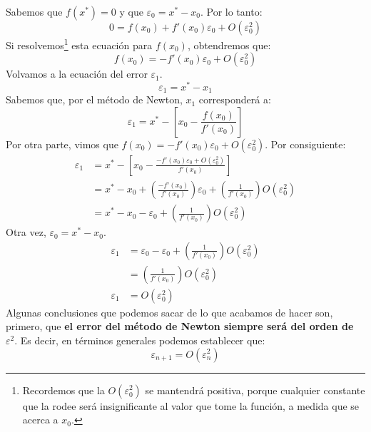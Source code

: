 \documentclass[12pt]{article}
\begin{document}
Sabemos que $f(x^{*}) = 0$ y que $\varepsilon_{0} = x^{*} - x_{0}$. Por lo tanto:
\[
	0 = f(x_{0}) + f'(x_{0})\varepsilon_{0} + O(\varepsilon_{0}^{2})
\]
Si resolvemos\footnote{Recordemos que la $O(\varepsilon_{0}^{2})$ se mantendrá positiva, porque cualquier constante que la rodee será insignificante al valor que tome la función, a medida que se acerca a $x_{0}$.} esta ecuación para $f(x_{0})$, obtendremos que:
\[
 f(x_{0}) = - f'(x_{0})\varepsilon_{0} + O(\varepsilon_{0}^{2})
\]
Volvamos a la ecuación del error $\varepsilon_{1}$.
\[\varepsilon_{1} = x^{*} - x_{1}\]
Sabemos que, por el método de Newton, $x_{1}$ corresponderá a:
\[
\varepsilon_{1} = x^{*}
                  - \left[x_{0} - \frac{f(x_{0})}{f'(x_{0})}\right]
\]
Por otra parte, vimos que $f(x_{0}) = - f'(x_{0})\varepsilon_{0} + O(\varepsilon_{0}^{2})$. Por consiguiente:
\begin{align*}
\varepsilon_{1} &= x^{*}
                  - \left[
                      x_{0} -
                      \frac{- f'(x_{0})\varepsilon_{0} +
                            O(\varepsilon_{0}^{2})}{f'(x_{0})}
                     \right] \\
                &= x^{*} - x_{0}
                   + \left(
					 	\frac{- f'(x_{0})}{f'(x_{0})}
                     \right)
                       \varepsilon_{0}
                   + \left(
                        \frac{1}{f'(x_{0})}
                     \right)
                       O(\varepsilon_{0}^{2}) \\
                &= x^{*} - x_{0} - \varepsilon_{0}
                   + \left(\frac{1}{f'(x_{0})}\right)
                     O(\varepsilon_{0}^{2})
\end{align*}
Otra vez, $\varepsilon_{0} = x^{*} - x_{0}$.
\begin{align*}
\varepsilon_{1} &= \varepsilon_{0} - \varepsilon_{0}
                   + \left(\frac{1}{f'(x_{0})}\right)
                     O(\varepsilon_{0}^{2}) \\
                &= \left(\frac{1}{f'(x_{0})}\right)
                     O(\varepsilon_{0}^{2}) \\
\varepsilon_{1} &= O(\varepsilon_{0}^{2})
\end{align*}
Algunas conclusiones que podemos sacar de lo que acabamos de hacer son, primero, que \textbf{el error del método de Newton siempre será del orden de $\varepsilon^{2}$}. Es decir, en términos generales podemos establecer que:
\[\varepsilon_{n + 1} = O(\varepsilon_{n}^{2})\]
\end{document}
